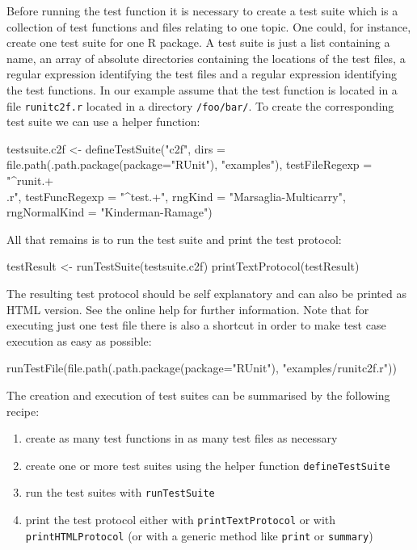 \documentclass[12pt, a4paper]{article}
\begin{document}
Before running the test function it is necessary to create a test suite which is a collection of test functions and files relating to one topic. One could, for instance, create one test suite for one R package. A test suite is just a list containing a name, an array of absolute directories containing the locations of the test files, a regular expression identifying the test files and a regular expression identifying the test functions. In our example assume that the test function is located in a file {\tt runitc2f.r} located in a directory {\tt /foo/bar/}. To create the corresponding test suite we can use a helper function:
\begin{Sinput}
testsuite.c2f <- defineTestSuite("c2f",
                 dirs = file.path(.path.package(package="RUnit"),
                            "examples"),
                 testFileRegexp = "^runit.+\\.r",
                 testFuncRegexp = "^test.+",
                 rngKind = "Marsaglia-Multicarry",
                 rngNormalKind = "Kinderman-Ramage")
\end{Sinput}
All that remains is to run the test suite and print the test protocol:
\begin{Sinput}
testResult <- runTestSuite(testsuite.c2f)
printTextProtocol(testResult)
\end{Sinput}
The resulting test protocol should be self explanatory and can also be printed as HTML version. See the online help for further information.
Note that for executing just one test file there is also a shortcut in order to make test case execution as easy as possible:
 \begin{Sinput}
runTestFile(file.path(.path.package(package="RUnit"),
            "examples/runitc2f.r"))
\end{Sinput}

The creation and execution of test suites can be summarised by the following recipe:
\begin{enumerate}
\item{create as many test functions in as many test files as necessary }
\item{create one or more test suites using the helper function {\tt defineTestSuite}}
\item{run the test suites with {\tt runTestSuite}}
\item{print the test protocol either with {\tt printTextProtocol} or with {\tt printHTMLProtocol} (or with a generic method like {\tt print} or {\tt summary})}
\end{enumerate}
\end{document}
